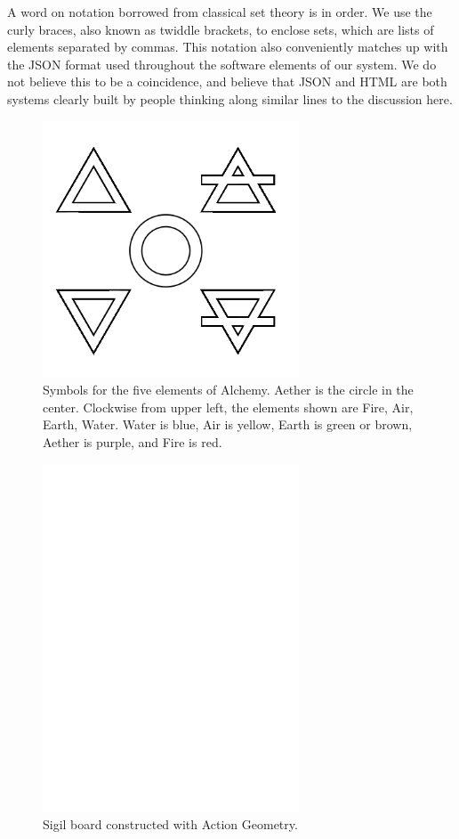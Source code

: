 A word on notation borrowed from classical set theory is in order.  We use the curly braces, also known as twiddle brackets, to enclose sets, which are lists of elements separated by commas.  This notation also conveniently matches up with the JSON format used throughout the software elements of our system.  We do not believe this to be a coincidence, and believe that JSON and HTML are both systems clearly built by people thinking along similar lines to the discussion here.  



\begin{figure}
	\centering
	\includegraphics[width=3in]{figures/magic/alchemy.png}
	\caption[alchemy]
	{Symbols for the five elements of Alchemy.  Aether is the circle in the center.  Clockwise from upper left, the elements shown are Fire, Air, Earth, Water.  Water is blue, Air is yellow, Earth is green or brown, Aether is purple, and Fire is red.}
\end{figure}

\begin{figure}
	\centering
	\includegraphics[width=3in]{figures/shapes/blank.png}
    \caption[sigilblank]
	{Sigil board constructed with Action Geometry.} 
\end{figure}



